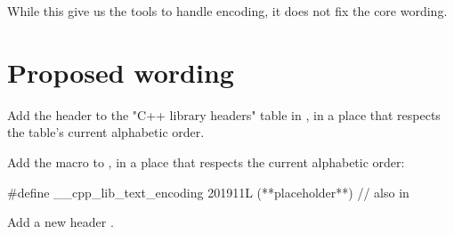 \documentclass{wg21}
\begin{document}
While this give us the tools to handle encoding, it does not fix the core wording.

\newpage


\section{Proposed wording}

Add the header  to the "C++ library headers" table in
\tcode{[headers]}, in a place that respects the table’s current alphabetic
order.

Add the macro  to , in a
place that respects the current alphabetic order:

\begin{codeblock}
#define __cpp_lib_text_encoding 201911L (**placeholder**) // also in 
\end{codeblock}

Add a new header .
\end{document}
